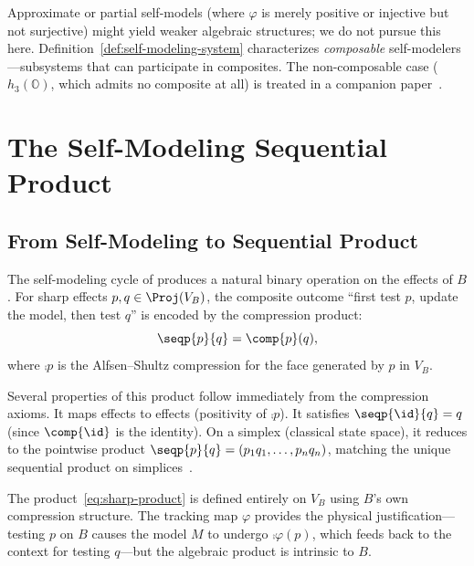 \documentclass[11pt]{article}
\begin{document}
\begin{remark}
  Approximate or partial self-models (where $\varphi$ is merely
  positive or injective but not surjective) might yield weaker
  algebraic structures; we do not pursue this here.
  Definition~\ref{def:self-modeling-system} characterizes
  \emph{composable} self-modelers---subsystems that can participate
  in composites.  The non-composable case
  ($h_{3}(\mathbb{O})$, which admits no composite at all) is treated
  in a companion paper~\cite{ehrlich2026sm}.
\end{remark}


\section{The Self-Modeling Sequential Product}
\label{sec:sp}


\subsection{From Self-Modeling to Sequential Product}
\label{sec:sp-sharp}

The self-modeling cycle of  produces a natural
binary operation on the effects of $B$.  For sharp effects
$p, q \in \Proj(V_{B})$, the composite outcome ``first test $p$,
update the model, then test $q$'' is encoded by the compression
product:
\begin{equation}\label{eq:sharp-product}
  \seqp{p}{q} = \comp{p}(q),
\end{equation}
where $\comp{p}$ is the Alfsen--Shultz compression for the face
generated by $p$ in $V_{B}$.

Several properties of this product follow immediately from the
compression axioms.  It maps effects to effects (positivity of
$\comp{p}$).  It satisfies $\seqp{\id}{q} = q$ (since $\comp{\id}$ is
the identity).  On a simplex (classical state space), it reduces to
the pointwise product
$\seqp{p}{q} = (p_{1}q_{1}, \ldots, p_{n}q_{n})$, matching the unique
sequential product on simplices~\cite{GudderGreechie2002}.

\begin{remark}
  The product~\eqref{eq:sharp-product} is defined entirely on
  $V_{B}$ using $B$'s own compression structure.  The tracking map
  $\varphi$ provides the physical justification---testing $p$ on $B$
  causes the model $M$ to undergo $\comp{\varphi(p)}$, which feeds
  back to the context for testing $q$---but the algebraic product is
  intrinsic to $B$.
\end{remark}
\end{document}
